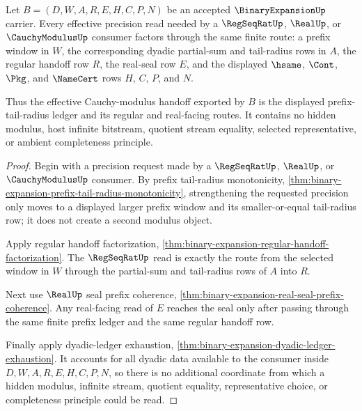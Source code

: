 \begin{theorem}
\label{thm:binary-expansion-cauchy-modulus-handoff}
Let $B=(D,W,A,R,E,H,C,P,N)$ be an accepted $\BinaryExpansionUp$ carrier. Every effective precision read needed by a $\RegSeqRatUp$, $\RealUp$, or $\CauchyModulusUp$ consumer factors through the same finite route: a prefix window in $W$, the corresponding dyadic partial-sum and tail-radius rows in $A$, the regular handoff row $R$, the real-seal row $E$, and the displayed $\hsame$, $\Cont$, $\Pkg$, and $\NameCert$ rows $H$, $C$, $P$, and $N$.

Thus the effective Cauchy-modulus handoff exported by $B$ is the displayed prefix-tail-radius ledger and its regular and real-facing routes. It contains no hidden modulus, host infinite bitstream, quotient stream equality, selected representative, or ambient completeness principle.
\end{theorem}
\begin{proof}
Begin with a precision request made by a $\RegSeqRatUp$, $\RealUp$, or $\CauchyModulusUp$ consumer. By prefix tail-radius monotonicity, \autoref{thm:binary-expansion-prefix-tail-radius-monotonicity}, strengthening the requested precision only moves to a displayed larger prefix window and its smaller-or-equal tail-radius row; it does not create a second modulus object.

Apply regular handoff factorization, \autoref{thm:binary-expansion-regular-handoff-factorization}. The $\RegSeqRatUp$ read is exactly the route from the selected window in $W$ through the partial-sum and tail-radius rows of $A$ into $R$.

Next use $\RealUp$ seal prefix coherence, \autoref{thm:binary-expansion-real-seal-prefix-coherence}. Any real-facing read of $E$ reaches the seal only after passing through the same finite prefix ledger and the same regular handoff row.

Finally apply dyadic-ledger exhaustion, \autoref{thm:binary-expansion-dyadic-ledger-exhaustion}. It accounts for all dyadic data available to the consumer inside $D,W,A,R,E,H,C,P,N$, so there is no additional coordinate from which a hidden modulus, infinite stream, quotient equality, representative choice, or completeness principle could be read.
\end{proof}

